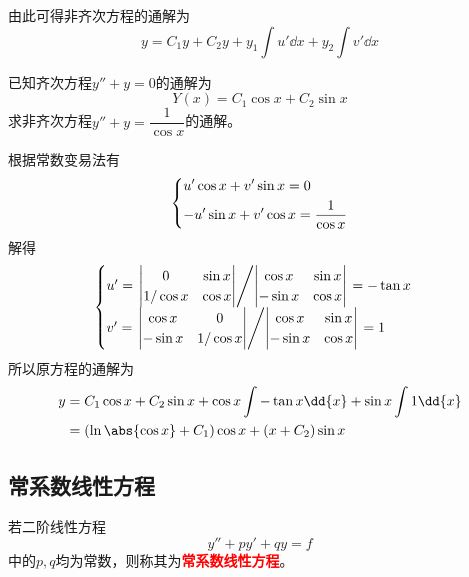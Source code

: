 由此可得非齐次方程的通解为
\[ y = C_1y + C_2y + y_1\int u'\dd{x} + y_2\int v'\dd{x} \]

\begin{example}
    已知齐次方程$y''+y=0$的通解为
    \[ Y(x) = C_1\cos x + C_2\sin x \]
    求非齐次方程$y''+y = \dfrac{1}{\cos x}$的通解。
\end{example}
\begin{solution}
    根据常数变易法有
    \[
        \begin{dcases}
            u'\cos x + v'\sin x = 0 \\
            -u'\sin x + v'\cos x = \frac{1}{\cos x}
        \end{dcases}
    \]
    解得
    \[
        \begin{cases}
            u' =
            \left.
            \begin{vmatrix}
                0        & \sin x \\
                1/\cos x & \cos x
            \end{vmatrix}
            \middle/
            \begin{vmatrix}
                \cos x  & \sin x \\
                -\sin x & \cos x
            \end{vmatrix}
            \right.
            = -\tan x
            \\
            v' =
            \left.
            \begin{vmatrix}
                \cos x  & 0        \\
                -\sin x & 1/\cos x
            \end{vmatrix}
            \middle/
            \begin{vmatrix}
                \cos x  & \sin x \\
                -\sin x & \cos x
            \end{vmatrix}
            \right.
            = 1
        \end{cases}
    \]
    所以原方程的通解为
    \begin{align*}
        y & = C_1\cos x + C_2\sin x + \cos x\int -\tan x \dd{x} + \sin x\int 1\dd{x} \\
          & = (\ln\abs{\cos x}+C_1)\cos x + (x+C_2)\sin x
    \end{align*}
\end{solution}

\subsection{常系数线性方程}
若二阶线性方程
\[ y'' + py' + qy = f \]
中的$p,q$均为常数，则称其为\textcolor{red}{\textbf{\textsf{常系数线性方程}}}。
